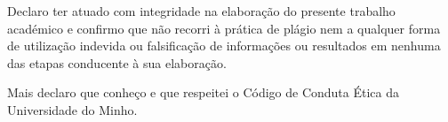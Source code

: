 Declaro ter atuado com integridade na elaboração do presente trabalho académico e confirmo que não recorri à prática de plágio nem a qualquer forma de utilização indevida ou falsificação de informações ou resultados em nenhuma das etapas conducente à sua elaboração.

Mais declaro que conheço e que respeitei o Código de Conduta Ética da Universidade do Minho.
